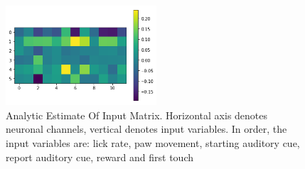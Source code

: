 \documentclass[a4paper,10pt]{article}
\begin{document}
\begin{figure}
  \centering
  \includegraphics[width=0.5\textwidth]{img/marN_analytic_withinput_B1.png}
  \caption{Analytic Estimate Of Input Matrix. Horizontal axis denotes neuronal channels, vertical denotes input variables. In order, the input variables are: lick rate, paw movement, starting auditory cue, report auditory cue, reward and first touch}
  \label{fig:marN_analytic_withinput_B1}
\end{figure}
\end{document}

